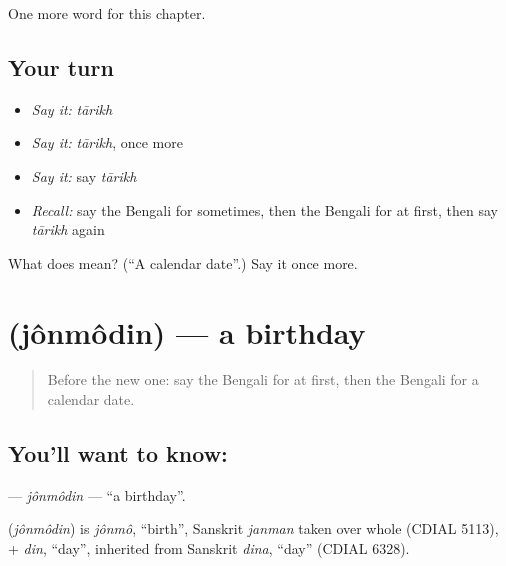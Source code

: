 \begin{grammarlens}[title={What you've built}]
One more word for this chapter.
\end{grammarlens}

\subsection*{Your turn}
\begin{itemize}
\raggedright
  \item \emph{Say it:} \emph{tārikh}
  \item \emph{Say it:} \emph{tārikh}, once more
  \item \emph{Say it:} say \emph{tārikh}
  \item \emph{Recall:} say the Bengali for sometimes, then the Bengali for at first, then say \emph{tārikh} again
\end{itemize}

\begin{tcolorbox}[breakable,colback=teal!4,colframe=teal!35!black,title={Before you move on}]
What does  mean? (\textquotedblleft{}A calendar date\textquotedblright{}.) Say it once more.
\end{tcolorbox}
\section[\texorpdfstring{\bn{জন্মদিন} (jônmôdin)}{জন্মদিন (jônmôdin)}]{ (jônmôdin) — a birthday}

\label{lesson:BN-C156-jonmodin}



\begin{quote}
Before the new one: say the Bengali for at first, then the Bengali for a calendar date.
\end{quote}

\subsection*{You'll want to know: }
\textbf{} — \emph{jônmôdin} — \textquotedblleft{}a birthday\textquotedblright{}.

\begin{cousinweb}
\textbf{} (\emph{jônmôdin}) is \emph{jônmô}, \textquotedblleft{}birth\textquotedblright{}, Sanskrit \emph{janman} taken over whole (CDIAL 5113), + \emph{din}, \textquotedblleft{}day\textquotedblright{}, inherited from Sanskrit \emph{dina}, \textquotedblleft{}day\textquotedblright{} (CDIAL 6328).
\end{cousinweb}

